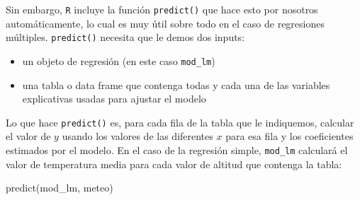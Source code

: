 \documentclass[
  letterpaper,
  DIV=11,
  numbers=noendperiod]{scrreprt}
\newenvironment{Shaded}{\begin{snugshade}}{\end{snugshade}}
\newcommand{\FunctionTok}[1]{\textcolor[rgb]{0.28,0.35,0.67}{#1}}
\newcommand{\NormalTok}[1]{\textcolor[rgb]{0.00,0.23,0.31}{#1}}
\providecommand{\tightlist}{%
  \setlength{\itemsep}{0pt}\setlength{\parskip}{0pt}}\usepackage{longtable,booktabs,array}
\begin{document}
Sin embargo, \texttt{R} incluye la función \texttt{predict()} que hace
esto por nosotros automáticamente, lo cual es muy útil sobre todo en el
caso de regresiones múltiples. \texttt{predict()} necesita que le demos
dos inputs:

\begin{itemize}
\tightlist
\item
  un objeto de regresión (en este caso \texttt{mod\_lm})
\item
  una tabla o data frame que contenga todas y cada una de las variables
  explicativas usadas para ajustar el modelo
\end{itemize}

Lo que hace \texttt{predict()} es, para cada fila de la tabla que le
indiquemos, calcular el valor de \(y\) usando los valores de las
diferentes \(x\) para esa fila y los coeficientes estimados por el
modelo. En el caso de la regresión simple, \texttt{mod\_lm} calculará el
valor de temperatura media para cada valor de altitud que contenga la
tabla:

\begin{Shaded}
\begin{Highlighting}[]
\FunctionTok{predict}\NormalTok{(mod\_lm, meteo)}
\end{Highlighting}
\end{Shaded}
\end{document}
